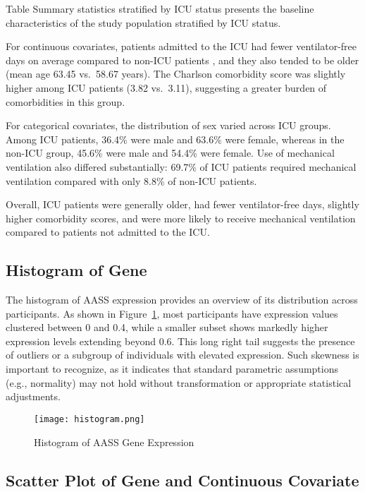 \documentclass{article}
\begin{document}
Table Summary statistics stratified by ICU status presents the baseline characteristics of the study population stratified by ICU status. 

For continuous covariates, patients admitted to the ICU had fewer ventilator-free days on average compared to non-ICU patients , and they also tended to be older (mean age 63.45 vs.\ 58.67 years). The Charlson comorbidity score was slightly higher among ICU patients (3.82 vs.\ 3.11), suggesting a greater burden of comorbidities in this group.

For categorical covariates, the distribution of sex varied across ICU groups. Among ICU patients, 36.4\% were male and 63.6\% were female, whereas in the non-ICU group, 45.6\% were male and 54.4\% were female. Use of mechanical ventilation also differed substantially: 69.7\% of ICU patients required mechanical ventilation compared with only 8.8\% of non-ICU patients. 

Overall, ICU patients were generally older, had fewer ventilator-free days, slightly higher comorbidity scores, and were more likely to receive mechanical ventilation compared to patients not admitted to the ICU.






\subsection{Histogram of Gene}

The histogram of AASS expression provides an overview of its distribution across participants. As shown in Figure~\ref{fig:hist}, most participants have expression values clustered between 0 and 0.4, while a smaller subset shows markedly higher expression levels extending beyond 0.6. This long right tail suggests the presence of outliers or a subgroup of individuals with elevated expression. Such skewness is important to recognize, as it indicates that standard parametric assumptions (e.g., normality) may not hold without transformation or appropriate statistical adjustments. 

\begin{figure}[H]
  \centering
  \texttt{[image: histogram.png]}
  \caption{Histogram of AASS Gene Expression}
  \label{fig:hist}
\end{figure}



\subsection{Scatter Plot of Gene and Continuous Covariate}
\end{document}
